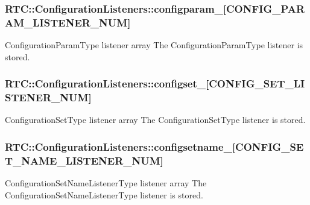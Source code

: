 \subsubsection[{configparam\_\-}]{ {\bf RTC::ConfigurationListeners::configparam\_\-}[CONFIG\_\-PARAM\_\-LISTENER\_\-NUM]}\label{classRTC_1_1ConfigurationListeners_a4b5c4442f95009363213b81d0d082a19}


ConfigurationParamType listener array The ConfigurationParamType listener is stored. 

\subsubsection[{configset\_\-}]{ {\bf RTC::ConfigurationListeners::configset\_\-}[CONFIG\_\-SET\_\-LISTENER\_\-NUM]}\label{classRTC_1_1ConfigurationListeners_a9a02da65a4ffc46ff163fd254e1cf95b}


ConfigurationSetType listener array The ConfigurationSetType listener is stored. 

\subsubsection[{configsetname\_\-}]{ {\bf RTC::ConfigurationListeners::configsetname\_\-}[CONFIG\_\-SET\_\-NAME\_\-LISTENER\_\-NUM]}\label{classRTC_1_1ConfigurationListeners_af6841756935a113ae387ba212daba655}


ConfigurationSetNameListenerType listener array The ConfigurationSetNameListenerType listener is stored. 

